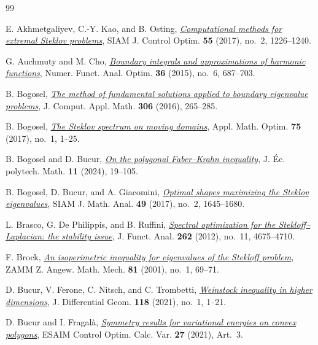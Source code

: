 \documentclass[11pt]{amsart}
\theoremstyle{remark}\newtheorem{remark}[theorem]{Remark}
\numberwithin{equation}{section}
\begin{document}
\begin{thebibliography}{99}
\raggedbottom

E. Akhmetgaliyev, C.-Y. Kao, and B. Osting,
\href{https://doi.org/10.1137/16M1067263}{\emph{Computational methods for extremal Steklov problems}},
SIAM J. Control Optim. \textbf{55} (2017), no.~2, 1226--1240.

G. Auchmuty and M. Cho,
\href{https://doi.org/10.1080/01630563.2015.1031383}{\emph{Boundary integrals and approximations of harmonic functions}},
Numer. Funct. Anal. Optim. \textbf{36} (2015), no.~6, 687--703.

B. Bogosel,
\href{https://doi.org/10.1016/j.cam.2016.04.008}{\emph{The method of fundamental solutions applied to boundary eigenvalue problems}},
J. Comput. Appl. Math. \textbf{306} (2016), 265--285.

B. Bogosel,
\href{https://doi.org/10.1007/s00245-015-9321-5}{\emph{The Steklov spectrum on moving domains}},
Appl. Math. Optim. \textbf{75} (2017), no.~1, 1--25.

B. Bogosel and D. Bucur,
\href{https://doi.org/10.5802/jep.250}{\emph{On the polygonal Faber--Krahn inequality}},
J. \'Ec. polytech. Math. \textbf{11} (2024), 19--105.

B. Bogosel, D. Bucur, and A. Giacomini,
\href{https://doi.org/10.1137/16M1075260}{\emph{Optimal shapes maximizing the Steklov eigenvalues}},
SIAM J. Math. Anal. \textbf{49} (2017), no.~2, 1645--1680.

L. Brasco, G. De Philippis, and B. Ruffini,
\href{https://doi.org/10.1016/j.jfa.2012.03.017}{\emph{Spectral optimization for the Stekloff--Laplacian: the stability issue}},
J. Funct. Anal. \textbf{262} (2012), no.~11, 4675--4710.

F. Brock,
\href{https://doi.org/10.1002/1521-4001(200101)81:1\%3C69::AID-ZAMM69\%3E3.0.CO;2-\%23}{\emph{An isoperimetric inequality for eigenvalues of the Stekloff problem}},
ZAMM Z. Angew. Math. Mech. \textbf{81} (2001), no.~1, 69--71.

D. Bucur, V. Ferone, C. Nitsch, and C. Trombetti,
\href{https://doi.org/10.4310/JDG/1620272940}{\emph{Weinstock inequality in higher dimensions}},
J. Differential Geom. \textbf{118} (2021), no.~1, 1--21.

D. Bucur and I. Fragal\`a,
\href{https://doi.org/10.1051/cocv/2020083}{\emph{Symmetry results for variational energies on convex polygons}},
ESAIM Control Optim. Calc. Var. \textbf{27} (2021), Art.~3.


\end{thebibliography}
\end{document}
